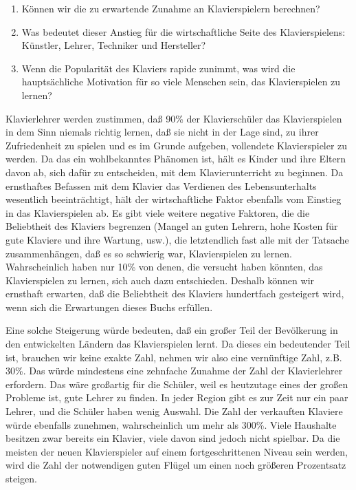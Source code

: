 \begin{enumerate} 
 \item Können wir die zu erwartende Zunahme an Klavierspielern berechnen?
 \item Was bedeutet dieser Anstieg für die wirtschaftliche Seite des Klavierspielens: Künstler, Lehrer, Techniker und Hersteller?
 \item Wenn die Popularität des Klaviers rapide zunimmt, was wird die hauptsächliche Motivation für so viele Menschen sein, das Klavierspielen zu lernen?
 \end{enumerate}
Klavierlehrer werden zustimmen, daß 90\% der Klavierschüler das Klavierspielen in dem Sinn niemals richtig lernen, daß sie nicht in der Lage sind, zu ihrer Zufriedenheit zu spielen und es im Grunde aufgeben, vollendete Klavierspieler zu werden.
Da das ein wohlbekanntes Phänomen ist, hält es Kinder und ihre Eltern davon ab, sich dafür zu entscheiden, mit dem Klavierunterricht zu beginnen.
Da ernsthaftes Befassen mit dem Klavier das Verdienen des Lebensunterhalts wesentlich beeinträchtigt, hält der wirtschaftliche Faktor ebenfalls vom Einstieg in das Klavierspielen ab.
Es gibt viele weitere negative Faktoren, die die Beliebtheit des Klaviers begrenzen (Mangel an guten Lehrern, hohe Kosten für gute Klaviere und ihre Wartung, usw.),
die letztendlich fast alle mit der Tatsache zusammenhängen, daß es so schwierig war, Klavierspielen zu lernen.
Wahrscheinlich haben nur 10\% von denen, die versucht haben könnten, das Klavierspielen zu lernen, sich auch dazu entschieden.
Deshalb können wir ernsthaft erwarten, daß die Beliebtheit des Klaviers hundertfach gesteigert wird, wenn sich die Erwartungen dieses Buchs erfüllen.

Eine solche Steigerung würde bedeuten, daß ein großer Teil der Bevölkerung in den entwickelten Ländern das Klavierspielen lernt.
Da dieses ein bedeutender Teil ist, brauchen wir keine exakte Zahl, nehmen wir also eine vernünftige Zahl, z.B. 30\%.
Das würde mindestens eine zehnfache Zunahme der Zahl der Klavierlehrer erfordern.
Das wäre großartig für die Schüler, weil es heutzutage eines der großen Probleme ist, gute Lehrer zu finden.
In jeder Region gibt es zur Zeit nur ein paar Lehrer, und die Schüler haben wenig Auswahl.
Die Zahl der verkauften Klaviere würde ebenfalls zunehmen, wahrscheinlich um mehr als 300\%.
Viele Haushalte besitzen zwar bereits ein Klavier, viele davon sind jedoch nicht spielbar.
Da die meisten der neuen Klavierspieler auf einem fortgeschrittenen Niveau sein werden, wird die Zahl der notwendigen guten Flügel um einen noch größeren Prozentsatz steigen.

